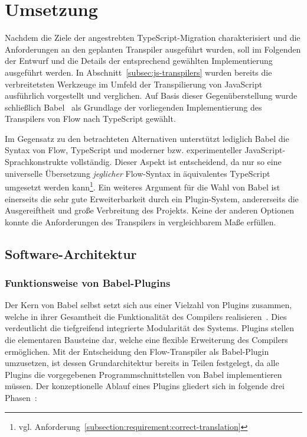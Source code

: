 \chapter{Umsetzung}

Nachdem die Ziele der angestrebten TypeScript-Migration charakterisiert und die Anforderungen an den geplanten Transpiler ausgeführt wurden, soll im Folgenden der Entwurf und die Details der entsprechend gewählten Implementierung ausgeführt werden.
In Abschnitt~\ref{subsec:js-transpilers} wurden bereits die verbreitetsten Werkzeuge im Umfeld der Transpilierung von JavaScript ausführlich vorgestellt und verglichen. Auf Basis dieser Gegenüberstellung wurde schließlich Babel~\autocite{BABEL} als Grundlage der vorliegenden Implementierung des Transpilers von Flow nach TypeScript gewählt.

Im Gegensatz zu den betrachteten Alternativen unterstützt lediglich Babel die Syntax von Flow, TypeScript und moderner bzw. experimenteller JavaScript-Sprachkonstrukte vollständig. Dieser Aspekt ist entscheidend, da nur so eine universelle Übersetzung \emph{jeglicher} Flow-Syntax in äquivalentes TypeScript umgesetzt werden kann\footnote{vgl. Anforderung~\ref{subsection:requirement:correct-translation}}. Ein weiteres Argument für die Wahl von Babel ist einerseits die sehr gute Erweiterbarkeit durch ein Plugin-System, andererseits die Ausgereiftheit und große Verbreitung des Projekts. Keine der anderen Optionen konnte die Anforderungen des Transpilers in vergleichbarem Maße erfüllen.

\section{Software-Architektur}

\subsection{Funktionsweise von Babel-Plugins}

Der Kern von Babel selbst setzt sich aus einer Vielzahl von Plugins zusammen, welche in ihrer Gesamtheit die Funktionalität des Compilers realisieren~\autocite{BABEL}. Dies verdeutlicht die tiefgreifend integrierte Modularität des Systems. Plugins stellen die elementaren Bausteine dar, welche eine flexible Erweiterung des Compilers ermöglichen.
Mit der Entscheidung den Flow-Transpiler als Babel-Plugin umzusetzen, ist dessen Grundarchitektur bereits in Teilen festgelegt, da alle Plugins die vorgegebenen Programmschnittstellen von Babel implementieren müssen. Der konzeptionelle Ablauf eines Plugins gliedert sich in folgende drei Phasen~\autocite{BABEL_HANDBOOK}:

